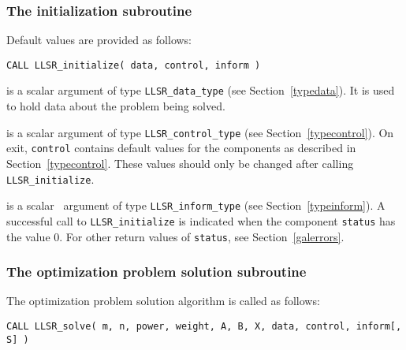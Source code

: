 \documentclass{galahad}
\newcommand{\packagename}{LLSR}
\begin{document}
\subsubsection{The initialization subroutine}\label{subinit}
 Default values are provided as follows:

\hskip0.5in
{\tt CALL \packagename\_initialize( data, control, inform )}

\begin{description}

 is a scalar \intentinout argument of type
{\tt \packagename\_data\_type}
(see Section~\ref{typedata}). It is used to hold data about the problem being
solved.

 is a scalar \intentout argument of type
{\tt \packagename\_control\_type}
(see Section~\ref{typecontrol}).
On exit, {\tt control} contains default values for the components as
described in Section~\ref{typecontrol}.
These values should only be changed after calling
{\tt \packagename\_initialize}.

 is a scalar \intentout\ argument of type
{\tt \packagename\_inform\_type}
(see Section~\ref{typeinform}). A successful call to
{\tt \packagename\_initialize}
is indicated when the  component {\tt status} has the value 0.
For other return values of {\tt status}, see Section~\ref{galerrors}.

\end{description}


\subsubsection{The optimization problem solution subroutine}
The optimization problem solution algorithm is called as follows:

\hskip0.5in
{\tt CALL \packagename\_solve( m, n, power, weight, A, B, X, data, control, inform[, S] )}
\end{document}
